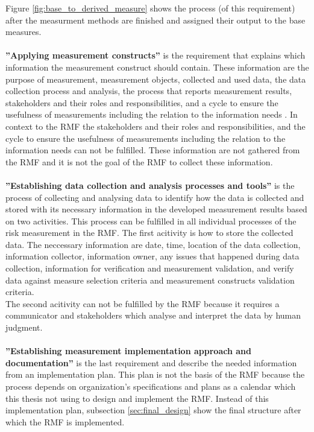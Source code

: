 Figure \ref{fig:base_to_derived_measure} shows the process (of this requirement) after the measurment methods are finished and assigned their output to the base measures.\\ \\

\textbf{''Applying measurement constructs''} is the requirement that explains which information the measurement construct should contain. These information are the purpose of measurement, measurement objects, collected and used data, the data collection process and analysis, the process that reports measurement results, stakeholders and their roles and responsibilities, and a cycle to ensure the usefulness of measurements including the relation to the information needs \cite{ISO_27004_2009}. In context to the RMF the stakeholders and their roles and responsibilities, and the cycle to ensure the usefulness of measurements including the relation to the information needs can not be fulfilled. These information are not gathered from the RMF and it is not the goal of the RMF to collect these information. \\ \\

\textbf{''Establishing data collection and analysis processes and tools''} is the process of collecting and analysing data to identify how the data is collected and stored with its necessary information in the developed measurement results based on two activities. This process can be fulfilled in all individual processes of the risk measurement in the RMF. The first acitivity is how to store the collected data. The neccessary information are date, time, location of the data collection, information collector, information owner, any issues that happened during data collection, information for verification and measurement validation, and verify data against measure selection criteria and measurement constructs validation criteria. \\ The second acitivity can not be fulfilled by the RMF because it requires a communicator and stakeholders which analyse and interpret the data by human judgment. \\ \\

\textbf{''Establishing measurement implementation approach and documentation''} is the last requirement and describe the needed information from an implementation plan. This plan is not the basis of the RMF because the process depends on organization's specifications and plans as a calendar which this thesis not using to design and implement the RMF. Instead of this implementation plan, subsection \ref{sec:final_design} show the final structure after which the RMF is implemented. \\ \\

